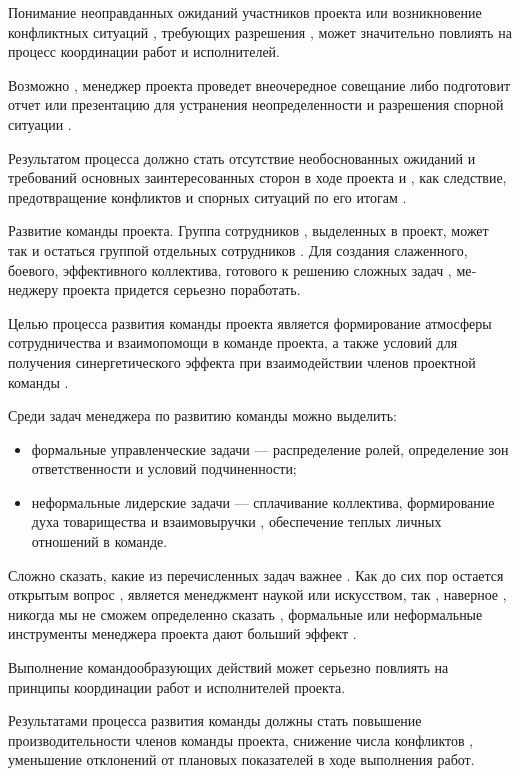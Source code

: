 Понимание неоправданных ожиданий участников проекта или возник­новение конфликтных ситуаций , требующих разрешения , может зна­чительно повлиять на процесс координации работ и исполнителей.

Возможно , менеджер проекта проведет внеочередное совещание либо подготовит отчет или презентацию для устранения неопределен­ности и разрешения спорной ситуации .

Результатом процесса должно стать отсутствие необоснованных ожи­даний и требований основных заинтересованных сторон в ходе проек­та и , как следствие, предотвращение конфликтов и спорных ситуаций по его итогам .

Развитие команды проекта.
Группа сотрудников , выделенных в проект, может так и остаться группой отдельных сотрудников .
Для создания слаженного, боевого, эффективного коллектива, готового к решению сложных задач , ме­неджеру проекта придется серьезно поработать.

Целью процесса развития команды проекта является формирова­ние атмосферы сотрудничества и взаимопомощи в команде проекта, а также условий для получения синергетического эффекта при взаимо­действии членов проектной команды .

Среди задач менеджера по развитию команды можно выделить:
\begin{itemize}
	\item формальные управленческие задачи --- распределение ролей, опре­деление зон ответственности и условий подчиненности;
	\item неформальные лидерские задачи --- сплачивание коллектива, фор­мирование духа товарищества и взаимовыручки , обеспечение теп­лых личных отношений в команде.
\end{itemize}

Сложно сказать, какие из перечисленных задач важнее .
Как до сих пор остается открытым вопрос , является менеджмент наукой или искусством, так , наверное , никогда мы не сможем определенно ска­зать , формальные или неформальные инструменты менеджера проек­та дают больший эффект .

Выполнение командообразующих действий может серьезно повлиять на принципы координации работ и исполнителей проекта.

Результатами процесса развития команды должны стать повышение производительности членов команды проекта, снижение числа кон­фликтов , уменьшение отклонений от плановых показателей в ходе выполнения работ.

